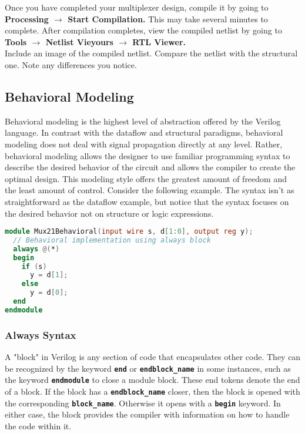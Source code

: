 \documentclass[12pt]{journal}
\begin{document}
\begin{question}
    Once you have completed your multiplexer design, compile it by going to \textbf{Processing $\longrightarrow$ Start Compilation.} This may take several minutes to complete. After compilation completes, view the compiled netlist by going to \textbf{Tools $\longrightarrow$ Netlist Vieyours $\longrightarrow$ RTL Viewer.} \\
    Include an image of the compiled netlist. Compare the netlist with the structural one. Note any differences you notice.
\end{question}

\clearpage
\subsection{Behavioral Modeling}
Behavioral modeling is the highest level of abstraction offered by the Verilog language. In contrast with the dataflow and structural paradigms, behavioral modeling does not deal with signal propagation directly at any level. Rather, behavioral modeling allows the designer to use familiar programming syntax to describe the desired behavior of the circuit and allows the compiler to create the optimal design. This modeling style offers the greatest amount of freedom and the least amount of control. Consider the following example. The syntax isn't as straightforward as the dataflow example, but notice that the syntax focuses on the desired behavior not on structure or logic expressions.


\begin{lstlisting}[language=verilog]
module Mux21Behavioral(input wire s, d[1:0], output reg y);
  // Behavioral implementation using always block
  always @(*)
  begin
    if (s)
      y = d[1];
    else
      y = d[0];
  end
endmodule
\end{lstlisting}

\subsubsection{Always Syntax}
A "block" in Verilog is any section of code that encapsulates other code. They can be recognized by the keyword \textbf{\texttt{end}} or \textbf{\texttt{end\textlangle block\_name\textrangle}} in some instances, such as the keyword \textbf{\texttt{endmodule}} to close a module block. These end tokens denote the end of a block. If the block has a \textbf{\texttt{end\textlangle block\_name\textrangle}} closer, then the block is opened with the corresponding \textbf{\texttt{block\_name}}. Otherwise it opens with a \textbf{\texttt{begin}} keyword. In either case, the block provides the compiler with information on how to handle the code within it.
\end{document}
